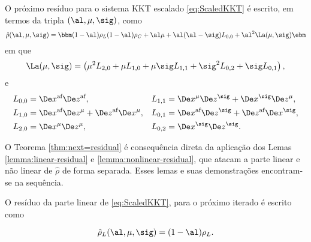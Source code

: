 \begin{teo}
\label{thm:next=residual}
O próximo resíduo para o sistema KKT escalado  \eqref{eq:ScaledKKT} é escrito, em
termos da tripla $(\al,\mu,\sig)$, como 
\begin{equation}
\label{eq:next-residual-all}
\nextrho(\al,\mu,\sig) = \bbm (1-\al)\rho_L \\   (1-\al)\rho_C+ \al\mu + \al(\al-\sig)L_{0,0} +  
\al^2 \La(\mu,\sig) \ebm
\end{equation}
em que 
\begin{equation}
\label{eq:Lambda-mu-sigma}
\La(\mu,\sig) = \left(\mu^2
 L_{2,0} + \mu L_{1,0} + \mu \sig L_{1,1} + \sig^2L_{0,2} + \sig
 L_{0,1}\right),
\end{equation}
e
\begin{equation}
\label{eq:defining-Lij}
\begin{aligned}
	L_{0,0} & = \dex\dez, & L_{1,1}  & = \Dex^\mu\Dez^\sig +
			\Dex^\sig\Dez^\mu, \\	
	L_{1,0} &  = \dex\Dez^\mu +
			\dez\Dex^\mu,  & L_{0,1}  & = \dex\Dez^\sig + \dez\Dex^\sig, \\	
	L_{2,0} &  = \Dex^\mu\Dez^\mu,  & L_{0,2}  & = \Dex^\sig\Dez^\sig .\\	
\end{aligned}
\end{equation}

\end{teo}

O Teorema \ref{thm:next=residual} é consequência direta da aplicação
dos Lemas \ref{lemma:linear-residual} e \ref{lemma:nonlinear-residual}, que
atacam a parte linear e não linear de  $\hat{\rho}$ de forma separada. Esses lemas
e suas demonstrações encontram-se na sequência. %
 
\begin{lema}\label{lemma:linear-residual}
O resíduo da parte linear de  \eqref{eq:ScaledKKT}, para o próximo iterado é
escrito como

\[
\hat{\rho}_L(\al,\mu,\sig) = (1-\al)\rho_L.
\]
 
\end{lema}

